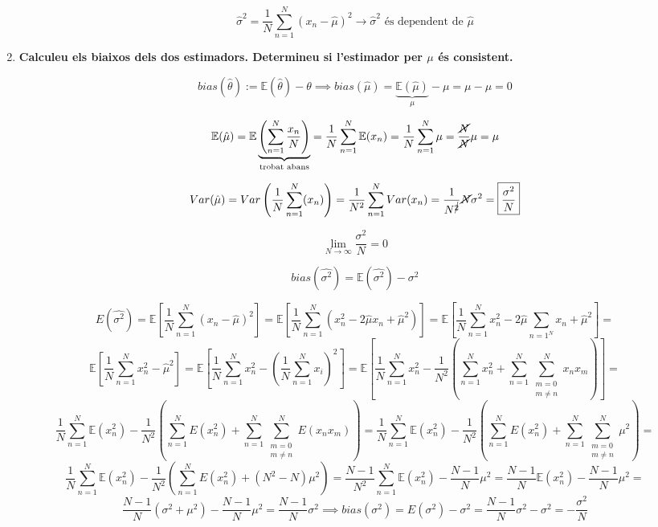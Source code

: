 \documentclass[a4paper]{article}
\begin{document}
\begin{enumerate}
$$ \hat{\sigma}^2 = \frac{1}{N} \sum_{n=1}^N (x_n - \hat{\mu})^2 \rightarrow \hat{\sigma}^2 \text{ és dependent de } \hat{\mu}$$

\item \textbf{Calculeu els biaixos dels dos estimadors. Determineu si l'estimador per $\mu$ és consistent.}

$$ bias(\hat{\theta}) := \mathbb{E}(\hat{\theta}) - \theta \implies bias(\hat{\mu}) = \underbrace{\mathbb{E}(\hat{\mu})}_{\mu} - \mu = \mu - \mu = 0 $$

$$ \mathbb{E}(\hat{\mu}) = \mathbb{E}\underbrace{\left(\sum_{n=1}^N \frac{x_n}{N}\right)}_{\text{trobat abans}} = \frac{1}{N}\sum_{n=1}^N \mathbb{E}(x_n) = \frac{1}{N}\sum_{n=1}^N \mu = \frac{\cancel{N}}{\cancel{N}}\mu = \mu$$

$$ Var(\hat{\mu}) = Var\left(\frac{1}{N} \sum_{n=1}^{N}(x_n)\right) = \frac{1}{N^2} \sum_{n=1}^{N}Var(x_n) = \frac{1}{N^{\cancel{2}}}\cancel{N}\sigma^2 = \boxed{\frac{\sigma^2}{N}}  $$

$$\lim_{N\to\infty} \frac{\sigma^2}{N} = 0$$

$$ bias(\hat{\sigma^2}) = \mathbb{E}(\hat{\sigma^2}) - \sigma^2 $$

$$E(\hat{\sigma^2}) =  \mathbb{E}\left[ \frac{1}{N}\sum_{n=1}^N (x_n - \hat{\mu})^2\right]
= \mathbb{E}\left[ \frac{1}{N}\sum_{n=1}^N (x_n^2 - 2\hat{\mu}x_n + \hat{\mu}^2)\right] 
= \mathbb{E}\left[ \frac{1}{N}\sum_{n=1}^N x_n^2 - 2\hat{\mu}\sum_{n=1^N}x_n + \hat{\mu}^2\right] = $$ 
$$\mathbb{E}\left[ \frac{1}{N}\sum_{n=1}^N x_n^2 -  \hat{\mu}^2\right]
= \mathbb{E}\left[ \frac{1}{N}\sum_{n=1}^N x_n^2 - \left(\frac{1}{N}\sum_{n=1}^N x_i\right)^2 \right]
= \mathbb{E}\left[ \frac{1}{N}\sum_{n=1}^N x_n^2 - \frac{1}{N^2}\left( \sum_{n=1}^{N} x_n^2 + \sum_{n=1}^{N}\sum_{\substack{m = 0 \\ m \neq n}}^{N}x_n x_m\right) \right] = $$
$$
 \frac{1}{N}\sum_{n=1}^N \mathbb{E}(x_n^2) - \frac{1}{N^2}\left( \sum_{n=1}^{N}E(x_n^2) + \sum_{n=1}^{N}\sum_{\substack{m = 0 \\ m \neq n}}^{N}E(x_n x_m)\right) 
 =\frac{1}{N}\sum_{n=1}^N \mathbb{E}(x_n^2) - \frac{1}{N^2}\left( \sum_{n=1}^{N}E(x_n^2) + \sum_{n=1}^{N}\sum_{\substack{m = 0 \\ m \neq n}}^{N}\mu^2\right) = $$
$$
\frac{1}{N}\sum_{n=1}^N \mathbb{E}(x_n^2) - \frac{1}{N^2}\left( \sum_{n=1}^{N}E(x_n^2) + (N^2 - N)\mu^2\right)
=\frac{N-1}{N^2}\sum_{n=1}^N \mathbb{E}(x_n^2) - \frac{N-1}{N}\mu^2
=\frac{N-1}{N} \mathbb{E}(x_n^2) - \frac{N-1}{N}\mu^2 =$$
$$
\frac{N-1}{N}(\sigma^2 + \mu^2) - \frac{N-1}{N}\mu^2
= \boxed{\frac{N - 1}{N}\sigma^2} \implies bias(\sigma^2) = E(\sigma^2) - \sigma^2 = \frac{N-1}{N}\sigma^2 - \sigma^2 = \boxed{-\frac{\sigma ^2}{N}}
$$


\end{enumerate}
\end{document}
